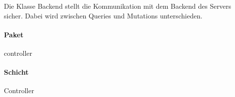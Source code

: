Die Klasse Backend stellt die Kommunikation mit dem Backend des Servers sicher.
Dabei wird zwischen Queries und Mutations unterschieden.

\paragraph*{Paket}
controller

\paragraph*{Schicht}
Controller